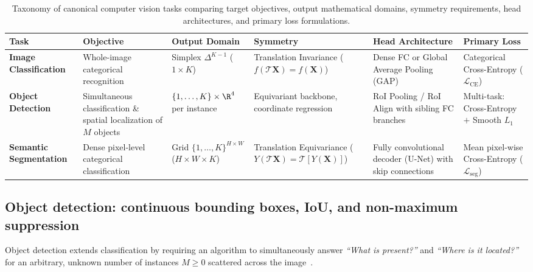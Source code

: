 \begin{table}[H]
\centering
\footnotesize
\setlength{\tabcolsep}{5pt}
\caption{Taxonomy of canonical computer vision tasks comparing target objectives, output mathematical domains, symmetry requirements, head architectures, and primary loss formulations.}
\label{tab:cv_tasks_comparison}
\vspace{4pt}
\begin{tabularx}{\textwidth}{>{\raggedright\arraybackslash}p{2.3cm} >{\raggedright\arraybackslash}p{2.6cm} >{\raggedright\arraybackslash}p{2.2cm} >{\raggedright\arraybackslash}p{2.4cm} >{\raggedright\arraybackslash}p{2.5cm} >{\raggedright\arraybackslash}X}
\toprule
\textbf{Task} & \textbf{Objective} & \textbf{Output Domain} & \textbf{Symmetry} & \textbf{Head Architecture} & \textbf{Primary Loss} \\
\midrule
\textbf{Image Classification} & Whole-image categorical recognition & Simplex $\Delta^{K-1}$ ($1 \times K$) & Translation Invariance ($f(\mathcal{T}\mathbf{X}) = f(\mathbf{X})$) & Dense FC or Global Average Pooling (GAP) & Categorical Cross-Entropy ($\mathcal{L}_{\text{CE}}$) \\
\addlinespace
\textbf{Object Detection} & Simultaneous classification \& spatial localization of $M$ objects & $\{1,\dots,K\} \times \R^4$ per instance & Equivariant backbone, coordinate regression & RoI Pooling / RoI Align with sibling FC branches & Multi-task: Cross-Entropy $+$ Smooth $L_1$ \\
\addlinespace
\textbf{Semantic Segmentation} & Dense pixel-level categorical classification & Grid $\{1,\dots,K\}^{H \times W}$ ($H \times W \times K$) & Translation Equivariance ($Y(\mathcal{T}\mathbf{X}) = \mathcal{T}[Y(\mathbf{X})]$) & Fully convolutional decoder (U-Net) with skip connections & Mean pixel-wise Cross-Entropy ($\mathcal{L}_{\text{seg}}$) \\
\bottomrule
\end{tabularx}
\end{table}

\subsection{Object detection: continuous bounding boxes, IoU, and non-maximum suppression}
\label{sec:object_detection_mechanics}

Object detection extends classification by requiring an algorithm to simultaneously answer \textit{``What is present?''} and \textit{``Where is it located?''} for an arbitrary, unknown number of instances $M \ge 0$ scattered across the image~\cite{prince2023understanding}.

